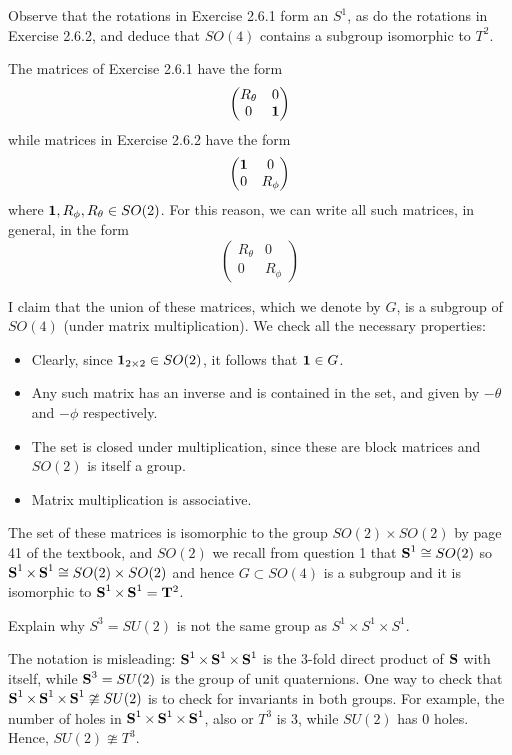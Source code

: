 \documentclass[11pt,onecolumn]{article}
\begin{document}
\begin{exercise}
 Observe that the rotations in Exercise 2.6.1 form an $S^1$, as do the rotations in Exercise 2.6.2, and deduce that $SO(4)$ contains a subgroup isomorphic to $T^2$. 
\end{exercise}
\begin{answer}

The matrices of Exercise 2.6.1 have the form $$ \begin{pmatrix} R_\theta & 0 \\ 0 & \operatorname{\mathbf{1}} \end{pmatrix} $$ while matrices in Exercise 2.6.2 have the form $$ \begin{pmatrix} \operatorname{\mathbf{1}} & 0 \\ 0 & R_\phi \end{pmatrix} $$ where $\operatorname{\mathbf{1}}, R_\phi, R_\theta \in SO(2)$. For this reason, we can write all such matrices, in general, in the form $$ \begin{pmatrix} R_\theta & 0 \\ 0 & R_\phi \end{pmatrix} $$

I claim that the union of these matrices, which we denote by $G$, is a subgroup of $SO(4)$ (under matrix multiplication). We check all the necessary properties:

\begin{itemize}
    \item Clearly, since $\operatorname{\mathbf{1}}_{2 \times 2} \in SO(2)$, it follows that $\operatorname{\mathbf{1}} \in G$.
    \item Any such matrix has an inverse and is contained in the set, and given by $-\theta$ and $-\phi$ respectively.
    \item The set is closed under multiplication, since these are block matrices and $SO(2)$ is itself a group.
    \item Matrix multiplication is associative.
\end{itemize}

The set of these matrices is isomorphic to the group $SO(2) \times SO(2)$ by page 41 of the textbook, and $SO(2)$ we recall from question 1 that $\operatorname{\mathbf{S}}^1 \cong SO(2)$ so $\operatorname{\mathbf{S}}^1 \times \operatorname{\mathbf{S}}^1 \cong SO(2) \times SO(2)$ and hence $G \subset SO(4)$ is a subgroup and it is isomorphic to $\operatorname{\mathbf{S}}^1 \times \operatorname{\mathbf{S}}^1 = \mathbf{T}^2$.

\end{answer}
\begin{exercise}
Explain why $S^3 = SU(2)$ is not the same group as $S^1 \times S^1\times S^1$. 
\end{exercise}
\begin{answer}
The notation is misleading: $\operatorname{\mathbf{S}}^1 \times \operatorname{\mathbf{S}}^1 \times \operatorname{\mathbf{S}}^1$ is the 3-fold direct product of $\operatorname{\mathbf{S}}$ with itself, while $\operatorname{\mathbf{S}}^3 = SU(2)$ is the group of unit quaternions. One way to check that $\operatorname{\mathbf{S}}^1 \times \operatorname{\mathbf{S}}^1 \times \operatorname{\mathbf{S}}^1 \ncong SU(2)$ is to check for invariants in both groups. For example, the number of holes in $\operatorname{\mathbf{S}}^1 \times \operatorname{\mathbf{S}}^1 \times \operatorname{\mathbf{S}}^1$, also or $T^3$ is 3, while $SU(2)$ has 0 holes. Hence, $SU(2) \ncong T^3$.

\end{answer}
\end{document}
